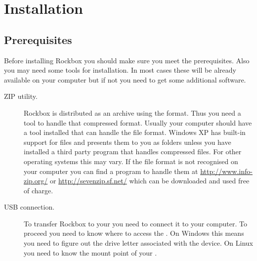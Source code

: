 \chapter{Installation}\label{sec:installation}

\section{Prerequisites}\label{sec:prerequisites}
Before installing Rockbox you should make sure you meet the prerequisites.
Also you may need some tools for installation. In most cases these will be
already available on your computer but if not you need to get some additional
software.

\begin{description}
  
\item[ZIP utility.]
  Rockbox is distributed as an archive using the
   format. Thus you need a tool to handle that compressed 
  format. Usually your computer should have a tool installed that can 
  handle the  file format. Windows XP has built-in support for 
   files and presents them to you as folders unless you have 
  installed a third party program that handles compressed files. For
  other operating systems this may vary. If the  file format 
  is not recognised on your computer you can find a program to handle them 
  at \url{http://www.info-zip.org/} or \url{http://sevenzip.sf.net/} which 
  can be downloaded and used free of charge.
  
\item[USB connection.]  To transfer Rockbox to your \dap{} you need to 
  connect it to your computer. To proceed you need to know where to access the 
  \dap{}. On Windows this means you need to figure out the drive letter 
  associated with the device. On Linux you need to know the mount point of 
  your \dap{}.
  


\end{description}
